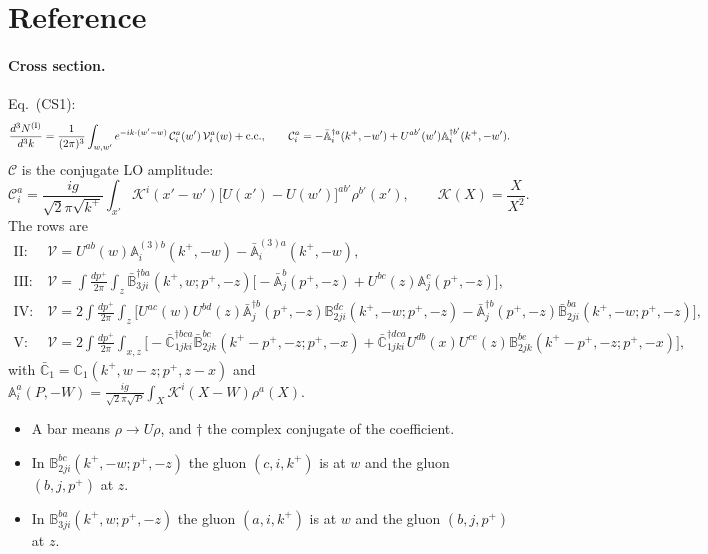 \documentclass[10pt]{article}
\numberwithin{equation}{section}
\def\mf#1{\mathbb{#1}}
\newcommand{\KK}{\mathcal K}
\begin{document}
\section{Reference}\label{sec:ref}
\paragraph{Cross section.} Eq.~(CS1):
\begin{equation}
\frac{d^3N^{\rm (I)}}{d^3k}=\frac{1}{(2\pi)^3}\int_{w,w'}e^{-ik\cdot(w'-w)}\,\mathcal C^a_i(w')\,\mathcal V^a_i(w)+{\rm c.c.},\qquad
\mathcal C^a_i=-\bar{\mf A}^{\dagger a}_i(k^+,-w')+U^{ab'}(w')\mf A^{\dagger b'}_i(k^+,-w').
\end{equation}
$\mathcal C$ is the conjugate LO amplitude:
\begin{equation}
\mathcal C^a_i=\frac{ig}{\sqrt2\pi\sqrt{k^+}}\int_{x'}\KK^i(x'-w')\big[U(x')-U(w')\big]^{ab'}\rho^{b'}(x'),\qquad \KK(X)=\frac{X}{X^2}.
\end{equation}
The rows are
\begin{align}
\text{II:}\ &\mathcal V=U^{ab}(w)\mf A^{(3)b}_i(k^+,-w)-\bar{\mf A}^{(3)a}_i(k^+,-w),\\
\text{III:}\ &\mathcal V=\int\frac{dp^+}{2\pi}\int_z\bar{\mf B}^{\dagger ba}_{3ji}(k^+,w;p^+,-z)\big[-\bar{\mf A}^b_j(p^+,-z)+U^{bc}(z)\mf A^c_j(p^+,-z)\big],\\
\text{IV:}\ &\mathcal V=2\int\frac{dp^+}{2\pi}\int_z\big[U^{ac}(w)U^{bd}(z)\bar{\mf A}^{\dagger b}_j(p^+,-z)\mf B^{dc}_{2ji}(k^+,-w;p^+,-z)-\bar{\mf A}^{\dagger b}_j(p^+,-z)\bar{\mf B}^{ba}_{2ji}(k^+,-w;p^+,-z)\big],\\
\text{V:}\ &\mathcal V=2\int\frac{dp^+}{2\pi}\int_{x,z}\big[-\bar{\mf C}^{\dagger bca}_{1jki}\bar{\mf B}^{bc}_{2jk}(k^+-p^+,-z;p^+,-x)+\bar{\mf C}^{\dagger dca}_{1jki}U^{db}(x)U^{ce}(z)\mf B^{be}_{2jk}(k^+-p^+,-z;p^+,-x)\big],
\end{align}
with $\bar{\mf C}_1=\mf C_1(k^+,w-z;p^+,z-x)$ and $\mf A^a_i(P,-W)=\frac{ig}{\sqrt2\pi\sqrt P}\int_X\KK^i(X-W)\rho^a(X)$.
\begin{itemize}
\item A bar means $\rho\to U\rho$, and $\dagger$ the complex conjugate of the coefficient.
\item In $\mf B^{bc}_{2ji}(k^+,-w;p^+,-z)$ the gluon $(c,i,k^+)$ is at $w$ and the gluon $(b,j,p^+)$ at $z$.
\item In $\mf B^{ba}_{3ji}(k^+,w;p^+,-z)$ the gluon $(a,i,k^+)$ is at $w$ and the gluon $(b,j,p^+)$ at $z$.
\end{itemize}
\end{document}
